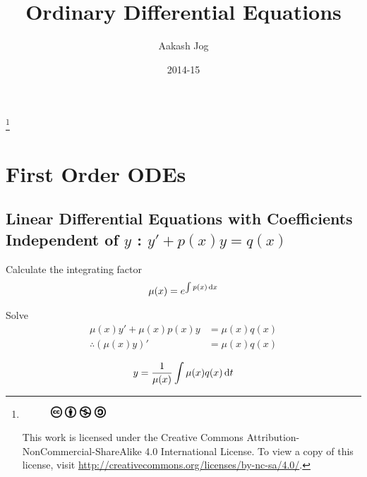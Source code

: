 \documentclass[fleqn, a4paper, 12pt, twoside]{article}
\title{Ordinary Differential Equations}
\author{Aakash Jog}
\date{2014-15}
\theoremstyle{definition}
\theoremstyle{theorem}
\newcommand\blfootnote[1]{%
	\begingroup
	\renewcommand\thefootnote{}\footnote{#1}%
	\addtocounter{footnote}{-1}%
	\endgroup
}
\begin{document}
\maketitle

\blfootnote
{	
	\begin{figure}[H]
		\includegraphics[height = 12pt]{cc.eps}
		\includegraphics[height = 12pt]{by.eps}
		\includegraphics[height = 12pt]{nc.eps}
		\includegraphics[height = 12pt]{sa.eps}
	\end{figure}
	This work is licensed under the Creative Commons Attribution-NonCommercial-ShareAlike 4.0 International License. To view a copy of this license, visit \url{http://creativecommons.org/licenses/by-nc-sa/4.0/}.
} %


\section{First Order ODEs}

\subsection{Linear Differential Equations with Coefficients Independent of $y$ : $y' + p(x) y = q(x)$}

\begin{algorithmic}[1]
	\item 
		Calculate the integrating factor
		\begin{equation*}
			\mu(x) = e^{\int p(x) \dif x}
		\end{equation*}
	\item 
		Solve
		\begin{align*}
			\mu(x) y' + \mu(x) p(x) y &= \mu(x) q(x)\\
			\therefore \left( \mu(x) y \right)' &= \mu(x) q(x)
		\end{align*}
	\item 
		\begin{equation*}
			y = \frac{1}{\mu(x)} \int \mu(x) q(x) \dif t
		\end{equation*}
\end{algorithmic}
\end{document}
